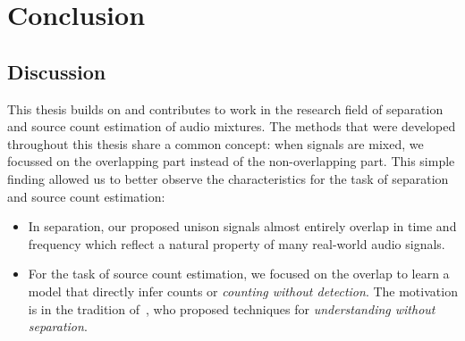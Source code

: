 \chapter{Conclusion}%
\label{cha:conclusion}


\section{Discussion}
This thesis builds on and contributes to work in the research field of separation and source count estimation of audio mixtures. The methods that were developed throughout this thesis share a common concept: when signals are mixed, we focussed on the overlapping part instead of the non-overlapping part. 
This simple finding allowed us to better observe the characteristics for the task of separation and source count estimation:

\begin{itemize}
  \item In separation, our proposed unison signals almost entirely overlap in time and frequency which reflect a natural property of many real-world audio signals.
  \item For the task of source count estimation, we focused on the overlap to learn a model that directly infer counts or \emph{counting without detection}. The motivation is in the tradition of~\cite{scheirer99}, who proposed techniques for \emph{understanding without separation}.
\end{itemize}

